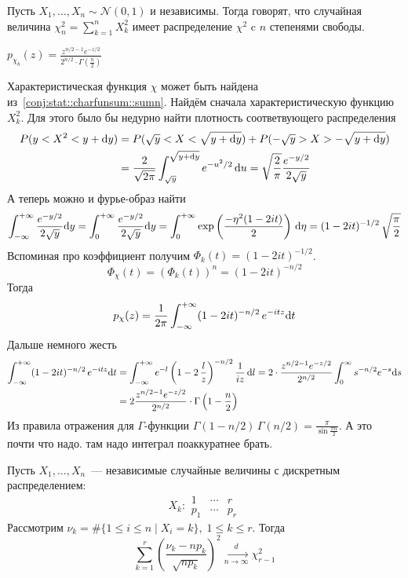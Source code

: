 \documentclass[12pt,timbord]{../../../notes}
\begin{document}
\begin{defn}\label{defn:stat::genmuavr::chi}
  Пусть $X_1, \dotsc, X_n \sim \mathcal N (0,1)$ и независимы. Тогда говорят, что случайная
  величина $\displaystyle \chi_n^2 = \sum_{k=1}^n X_k^2$ имеет распределение $\chi^2$ c $n$
  степенями свободы.
\end{defn}
\begin{prop}\label{prop:stat::genmuavr::chi}
  $\displaystyle p_{\chi_b}(z) = \frac{z^{n/2 -1} e^{-z/2}}{2^{n/2}\cdot \Gamma (\frac{n}{2} )}  $
\end{prop}
\begin{itlproof}
  Характеристическая функция $\chi$ может быть найдена из~\ref{conj:stat::charfunsum::sumn}.
  Найдём сначала характеристическую функцию $X_k^2$. Для этого было бы недурно найти плотность
  соответвующего распределения
  \[
    \begin{split}
      P(y < X^2 < y+ \mathrm{d} y) &= P(\sqrt y < X < \sqrt{y + \mathrm{d} y})+ P(-\sqrt y>X >-\sqrt{y+\mathrm{d} y})
      \\
      &= \frac{2}{\sqrt{2\pi}}  \int_{\sqrt y}^{\sqrt{y+\mathrm{d} y}} e^{-u^2/2} \, \mathrm{d} u 
      = \sqrt{\frac{2}{\pi} } \frac{e^{-y/2}}{2\sqrt y} 
    \end{split}
  \]
  А теперь можно и фурье-образ найти
  \[
    \int_{-\infty}^{+\infty}\frac{e^{-y/2}}{2\sqrt y}\mathrm{d} y = \int_{0}^{+\infty}\frac{e^{-y/2}}{2\sqrt y}\mathrm{d} y
    = \int_{0}^{+\infty} \exp\left(\frac{-\eta^2(1-2it)}{2}\right)\,\mathrm{d}\eta
    = (1-2it)^{-1/2} \, \sqrt{\frac\pi 2}
  \]
  Вспоминая про коэффициент получим $\Phi_k(t) = (1-2it)^{-1/2}$.
  \[
    \Phi_\chi(t) = \left(\Phi_k(t)\right)^n =  (1-2it)^{-n/2}
  \]
  Тогда \[
    p_\chi(z) = \frac{1}{2\pi} \int_{-\infty}^{+\infty} (1-2it)^{-n/2}\, e^{-itz}\mathrm{d} t
  \]
  Дальше немного жесть
  \begin{align*}
    \int_{-\infty}^{+\infty} (1-2it)^{-n/2}\, e^{-itz}\mathrm{d} t &= \int_{-\infty}^{+\infty} e^{-l} \left(1-2\, \frac{l}{z} \right)^{-n/2}
    \frac{1}{iz} \, \mathrm{d} l 
    = 2\cdot\frac{z^{n/2-1} e^{-z/2}}{2^{n/2}} \int_{0}^{\infty} s^{-n/2} e^{-s} \mathrm{d} s \\
    &= 2\frac{z^{n/2-1} e^{-z/2}}{2^{n/2}} \cdot \Gamma\left(1-\frac{n}{2} \right)
  \end{align*}
  Из правила отражения для $\Gamma$-функции 
  $\Gamma(1-n/2)\, \Gamma(n/2) = \frac{\pi}{\sin\frac{\pi n}{2} } $. А это почти что надо.
  \underdev
  там надо интеграл поаккуратнее брать.
\end{itlproof}

\begin{thrm}\label{thrm:stat::genmuavr}
  Пусть $X_1, \dotsc, X_n$~--- независимые случайные величины с дискретным распределением:
  \[
    X_k \colon
    \begin{array}{c|c|c}
      1 & \cdots & r \\ \hline
      p_1 & \cdots & p_r
    \end{array}
  \]
  Рассмотрим $\nu_k = \# \{ 1 \leqslant i \leqslant n \mid X_i =k\},\; 1\leqslant k \leqslant r$.
  Тогда 
  \[
    \sum_{k=1}^r \left( \frac{\nu_k - n p_k}{\sqrt{n p_k}}  \right)^2 \xrightarrow[n\to \infty]{d} \chi_{r-1}^2
  \]
\end{thrm}
\end{document}
